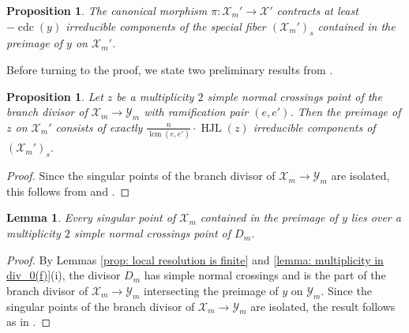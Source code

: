 \documentclass[12pt]{amsart}
\numberwithin{equation}{section}
\newtheorem{prop}[equation]{Proposition}
\newtheorem{lemma}[equation]{Lemma}
\theoremstyle{definition}
\newcommand{\X}{\mathcal{X}}
\newcommand{\Y}{\mathcal{Y}}
\DeclareMathOperator{\lcm}{lcm}
\DeclareMathOperator{\cdc}{cdc}
\DeclareMathOperator{\HJL}{HJL}
\begin{document}
\begin{prop}\label{prop: contractions}
    The canonical morphism $\pi:\X_m'\to\X'$ contracts at least $-\cdc(y)$ irreducible components of the special fiber $(\X_m')_s$ contained in the preimage of $y$ on $\X_m'$.
\end{prop}

Before turning to the proof, we state two preliminary results from \cite{Part1}.

\begin{prop}\label{prop: Part1 results}
    Let $z$ be a multiplicity $2$ simple normal crossings point of the branch divisor of $\X_m\to\Y_m$ with ramification pair $(e,e')$. Then the preimage of $z$ on $\X_m'$ consists of exactly $\frac{n}{\lcm(e,e')}\cdot\HJL(z)$ irreducible components of $(\X_m')_s$.
\end{prop}
\begin{proof}
    Since the singular points of the branch divisor of $\X_m\to\Y_m$ are isolated, this follows from \cite[Proposition 7.6(iii)]{Part1} and \cite[Remark 7.10]{Part1}.%
\end{proof}

\begin{lemma}\label{lemma: Part1 results singular points}
    Every singular point of $\X_m$ contained in the preimage of $y$ lies over a multiplicity $2$ simple normal crossings point of $D_m$. 
\end{lemma}
\begin{proof}
    By Lemmas \ref{prop: local resolution is finite} and \ref{lemma: multiplicity in div_0(f)}(i), the divisor $D_m$ has simple normal crossings and is the part of the branch divisor of $\X_m\to\Y_m$ intersecting the preimage of $y$ on $\Y_m$. Since the singular points of the branch divisor of $\X_m\to\Y_m$ are isolated, the result follows as in \cite[Proposition 7.6(i)]{Part1}.
\end{proof}
\end{document}
